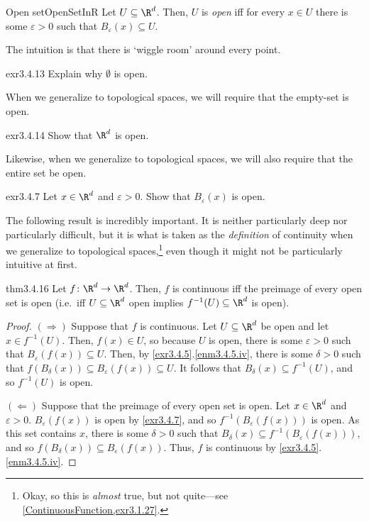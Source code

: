 \begin{dfn}{Open set}{OpenSetInR}
Let $U\subseteq \R ^d$.  Then, $U$ is \emph{open} iff for every $x\in U$ there is some $\varepsilon >0$ such that $B_\varepsilon (x)\subseteq U$.
\begin{rmk}
The intuition is that there is `wiggle room' around every point.
\end{rmk}
\end{dfn}
\begin{exr}{}{exr3.4.13}
Explain why $\emptyset$ is open.
\begin{rmk}
When we generalize to topological spaces, we will require that the empty-set is open.
\end{rmk}
\end{exr}
\begin{exr}{}{exr3.4.14}
Show that $\R ^d$ is open.
\begin{rmk}
Likewise, when we generalize to topological spaces, we will also require that the entire set be open.
\end{rmk}
\end{exr}
\begin{exr}{}{exr3.4.7}
Let $x\in \R ^d$ and $\varepsilon >0$.  Show that $B_\varepsilon (x)$ is open.
\end{exr}
The following result is incredibly important.  It is neither particularly deep nor particularly difficult, but it is what is taken as the \emph{definition} of continuity when we generalize to topological spaces,\footnote{Okay, so this is \emph{almost} true, but not quite---see \cref{ContinuousFunction,exr3.1.27}.} even though it might not be particularly intuitive at first.
\begin{thm}{}{thm3.4.16}
Let $f\colon \R ^d \rightarrow \R ^d$.  Then, $f$ is continuous iff the preimage of every open set is open (i.e.~iff $U\subseteq \R ^d$ open implies $f^{-1}(U)\subseteq \R ^d$ is open).
\begin{proof}
$(\Rightarrow )$ Suppose that $f$ is continuous.  Let $U\subseteq \R ^d$ be open and let $x\in f^{-1}(U)$.  Then, $f(x)\in U$, so because $U$ is open, there is some $\varepsilon >0$ such that $B_\varepsilon (f(x))\subseteq U$.  Then, by \cref{exr3.4.5}.\cref{enm3.4.5.iv}, there is some $\delta >0$ such that $f(B_\delta (x))\subseteq B_\varepsilon (f(x))\subseteq U$.  It follows that $B_\delta (x)\subseteq f^{-1}(U)$, and so $f^{-1}(U)$ is open.

\blankline
\noindent
$(\Leftarrow )$ Suppose that the preimage of every open set is open.  Let $x\in \R ^d$ and $\varepsilon >0$.  $B_\varepsilon (f(x))$ is open by \cref{exr3.4.7}, and so $f^{-1}(B_\varepsilon (f(x)))$ is open.  As this set contains $x$, there is some $\delta >0$ such that $B_\delta (x)\subseteq f^{-1}(B_\varepsilon (f(x)))$, and so $f(B_\delta (x))\subseteq B_\varepsilon (f(x))$.  Thus, $f$ is continuous by \cref{exr3.4.5}.\cref{enm3.4.5.iv}.
\end{proof}
\end{thm}

